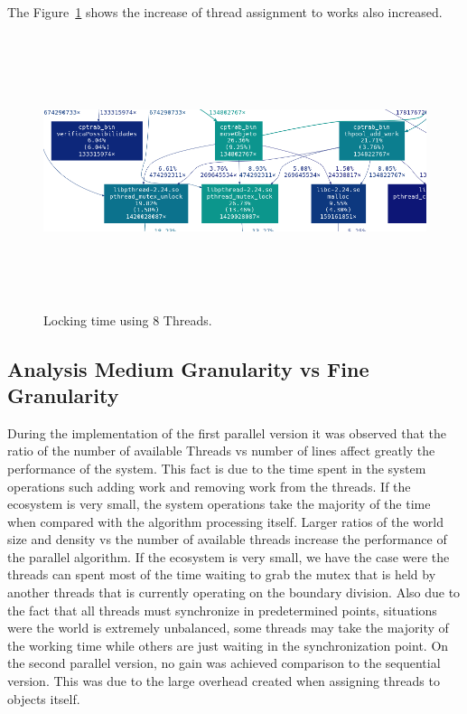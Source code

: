 \documentclass[10pt,a4paper,final]{report}
\begin{document}
The Figure~\ref{fig_mp2_1} shows the increase of thread assignment to works also increased.

\begin{figure}[H]
      \centering
      \includegraphics[height=8cm,width=12cm]{sub_grafico_mp2_8_200x201_Lock_2.png}
	        
      \caption{Locking time using 8 Threads.}
      \label{fig_mp2_1}
\end{figure}



\subsection{Analysis Medium Granularity vs Fine Granularity}
During the implementation of the first parallel version it was observed that the ratio of the number of available Threads vs number of lines affect greatly the performance of the system. This fact is due to the time spent in the system operations such adding work and removing work from the threads. If the ecosystem is very small, the system operations take the majority of the time when compared with the algorithm processing itself. Larger ratios of the world size and density vs the number of available threads increase the performance of the parallel algorithm. If the ecosystem is very small, we have the case were the threads can spent most of the time waiting to grab the mutex that is held by another threads that is currently operating on the boundary division. Also due to the fact that all threads must synchronize in predetermined points, situations were the world is extremely unbalanced, some threads may take the majority of the working time while others are just waiting in the synchronization point. On the second parallel version, no gain was achieved comparison to the sequential version. This was due to the large overhead created when assigning threads to objects itself. 
\end{document}
